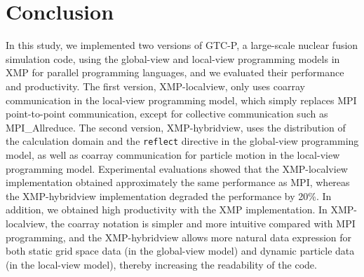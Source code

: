 \section{Conclusion\label{sec6}}
In this study, we implemented two versions of GTC-P, a large-scale nuclear fusion simulation code, using the global-view and local-view programming models in XMP for parallel programming languages, and we evaluated their performance and productivity. The first version, XMP-localview, only uses coarray communication in the local-view programming model, which simply replaces MPI point-to-point communication, except for collective communication such as MPI\_Allreduce. The second version, XMP-hybridview, uses the distribution of the calculation domain and the {\tt reflect} directive in the global-view programming model, as well as coarray communication for particle motion in the local-view programming model. Experimental evaluations showed that the XMP-localview implementation obtained approximately the same performance as MPI, whereas the XMP-hybridview implementation degraded the performance by 20\%. In addition, we obtained high productivity with the XMP implementation. In XMP-localview, the coarray notation is simpler and more intuitive compared with MPI programming, and the XMP-hybridview allows more natural data expression for both static grid space data (in the global-view model) and dynamic particle data (in the local-view model), thereby increasing the readability of the code.


